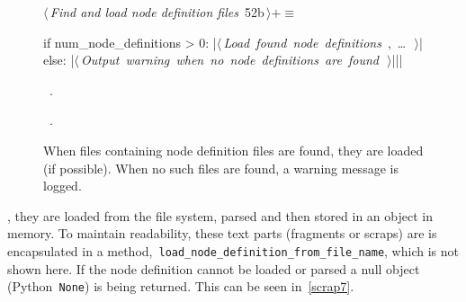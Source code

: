 \documentclass[%
    a4paper,    %
    justified,  %
    nobib,      %
    openany     %
]{tufte-book}
\makeatletter
\renewcommand{\label}[1]{\@tufte@label{##1}}%
\makeatother
\begin{document}
\begin{figure}[!htbp]
  \begin{flushleft} \small
\begin{minipage}{\linewidth}\label{scrap6}\raggedright\small
{} $\langle\,${\itshape Find and load node definition files}\nobreak\ {\footnotesize {52b}}$\,\rangle+\equiv$
\vspace{-1ex}
\begin{pythoncode}
if num_node_definitions > 0:
    |\hbox{$\langle\,${\itshape Load found node definitions}\nobreak\ {\footnotesize {}, \ldots\ }$\,\rangle$}|
else:
    |\hbox{$\langle\,${\itshape Output warning when no node definitions are found}\nobreak\ {\footnotesize {}}$\,\rangle$}||\NWsep|
\end{pythoncode}
\vspace{1.5ex}
\footnotesize
\begin{list}{}{\setlength{\itemsep}{-\parsep}\setlength{\itemindent}{-\leftmargin}}
\item \NWtxtMacroDefBy\ .
\item \NWtxtMacroRefIn\ .

\item{}
\end{list}
\end{minipage}\vspace{4ex}
\end{flushleft}
\caption{When files containing node definition files are found, they are
    loaded (if possible). When no such files are found, a warning message is
    logged.}
\end{figure}

, they are loaded
from the file system, parsed and then stored in an object in memory. To maintain
readability, these text parts (fragments or scraps) are is encapsulated in a
method,~\texttt{load_node_definition_from_file_name}, which is not
shown here. If the node definition cannot be loaded or parsed a null object
(Python~\texttt{None}) is being returned. This can be seen
in~\cref{scrap7}.
\end{document}
